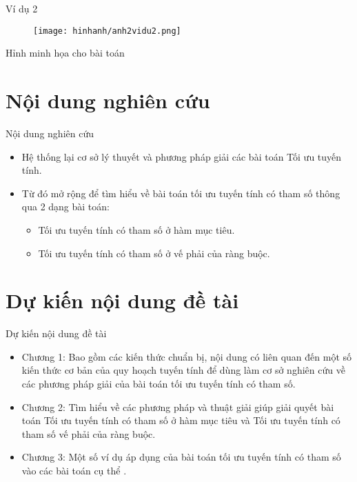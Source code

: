 \documentclass{beamer}
\begin{document}
\begin{frame}{Ví dụ 2}
    \begin{center}
        \begin{figure}
            
            \texttt{[image: hinhanh/anh2vidu2.png]}
      
        \end{figure}
        Hỉnh minh họa cho bài toán
    \end{center}
    
\end{frame}

\section{Nội dung nghiên cứu}
\begin{frame}{Nội dung nghiên cứu}
    \begin{itemize}
    \item Hệ thống lại cơ sở lý thuyết và phương pháp giải các bài toán Tối ưu tuyến tính.
    \item Từ đó mở rộng để tìm hiểu về bài toán tối ưu tuyến tính có tham số thông qua 2 dạng bài toán:
    \begin{itemize}
    \item Tối ưu tuyến tính có tham số ở hàm mục tiêu.
    \item Tối ưu tuyến tính có tham số ở vế phải của ràng buộc.
    \end{itemize}
    \end{itemize}
\end{frame}
\section{Dự kiến nội dung đề tài}
\begin{frame}{Dự kiến nội dung đề tài}
    \begin{itemize}
    \item Chương 1:  Bao gồm các kiến thức chuẩn bị, nội dung có liên quan đến
    một số kiến thức cơ bản của quy hoạch tuyến tính để dùng
    làm cơ sở nghiên cứu về các phương pháp giải của bài toán tối ưu tuyến tính có tham số.
    \item Chương 2: Tìm hiểu về các phương pháp và thuật giải giúp giải quyết bài toán Tối ưu tuyến tính có tham số ở hàm mục tiêu và Tối ưu tuyến tính có tham số vế phải của ràng buộc.
    \item Chương 3: Một số ví dụ áp dụng của bài toán tối ưu tuyến tính có tham số vào các bài toán cụ thể .
    \end{itemize}   
\end{frame}
\end{document}
